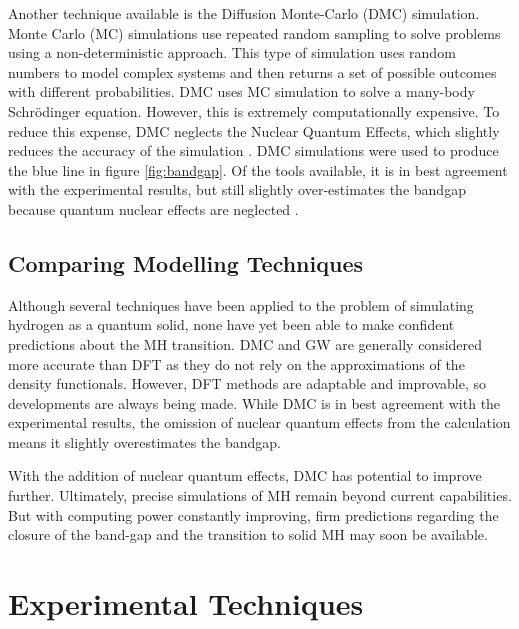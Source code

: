 \documentclass[esp]{FCEFyN-class}
\begin{document}
Another technique available is the Diffusion Monte-Carlo (DMC) simulation. Monte Carlo (MC) simulations use repeated random sampling to solve problems using a non-deterministic approach. This type of simulation uses random numbers to model complex systems and then returns a set of possible outcomes with different probabilities. DMC uses MC simulation to solve a many-body Schrödinger equation. However, this is extremely computationally expensive. To reduce this expense, DMC neglects the Nuclear Quantum Effects, which slightly reduces the accuracy of the simulation \cite{Markland2018}. DMC simulations were used to produce the blue line in figure \ref{fig:bandgap}. Of the tools available, it is in best agreement with the experimental results, but still slightly over-estimates the bandgap because quantum nuclear effects are neglected \cite{loubeyre2020}.

\subsection{Comparing Modelling Techniques}
Although several techniques have been applied to the problem of simulating hydrogen as a quantum solid, none have yet been able to make confident predictions about the MH transition. DMC and GW are generally considered more accurate than DFT as they do not rely on the approximations of the density functionals. However, DFT methods are adaptable and improvable, so developments are always being made. While DMC is in best agreement with the experimental results, the omission of nuclear quantum effects from the calculation means it slightly overestimates the bandgap.

With the addition of nuclear quantum effects, DMC has potential to improve further. Ultimately, precise simulations of MH remain beyond current capabilities. But with computing power constantly improving, firm predictions regarding the closure of the band-gap and the transition to solid MH may soon be available.

\vspace{7mm} %
\section{Experimental Techniques}
\label{sec:exp}
\end{document}
